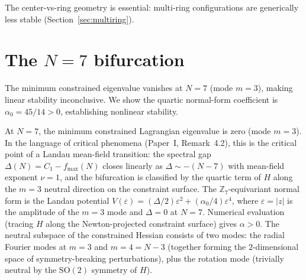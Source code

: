 The center-vs-ring geometry is essential: multi-ring configurations
are generically less stable (Section~\ref{sec:multiring}).


\section{The $N = 7$ bifurcation}
\label{sec:n7-bifurcation}
\label{sec:n7}

The minimum constrained eigenvalue vanishes at $N = 7$
(mode $m = 3$), making linear stability inconclusive.
We show the quartic normal-form coefficient is
$\alpha_0 = 45/14 > 0$, establishing nonlinear stability.

At $N = 7$, the minimum constrained Lagrangian eigenvalue is zero
(mode $m = 3$).  In the language of critical phenomena
(Paper~I, Remark~4.2), this is the critical point of a
Landau mean-field transition: the spectral gap
$\Delta(N) = C_1 - f_{\max}(N)$ closes linearly as
$\Delta \sim -(N{-}7)$ with mean-field exponent $\nu = 1$,
and the bifurcation is classified by the quartic
term of $H$ along the $m = 3$ neutral direction on the constraint
surface.  The $\mathbb{Z}_7$-equivariant normal form is the
Landau potential
$V(\varepsilon) = (\Delta/2)\varepsilon^2 + (\alpha_0/4)\varepsilon^4$,
where $\varepsilon = |z|$ is the amplitude of the $m = 3$ mode
and $\Delta = 0$ at $N = 7$.  Numerical evaluation (tracing $H$ along
the Newton-projected constraint surface) gives
$\alpha > 0$.  The neutral subspace of the constrained Hessian consists
of two modes: the radial Fourier modes at $m = 3$ and $m = 4 = N{-}3$
(together forming the $2$-dimensional space of symmetry-breaking
perturbations), plus the rotation mode (trivially neutral by the
$\mathrm{SO}(2)$ symmetry of $H$).

